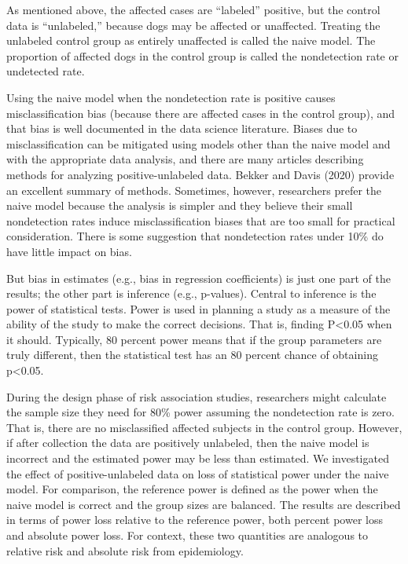 \documentclass[
]{article}
\begin{document}
As mentioned above, the affected cases are ``labeled'' positive, but the
control data is ``unlabeled,'' because dogs may be affected or
unaffected. Treating the unlabeled control group as entirely unaffected
is called the naive model. The proportion of affected dogs in the
control group is called the nondetection rate or undetected rate.

Using the naive model when the nondetection rate is positive causes
misclassification bias (because there are affected cases in the control
group), and that bias is well documented in the data science
literature.\cite{bd20} Biases due to misclassification can be mitigated
using models other than the naive model and with the appropriate data
analysis, and there are many articles describing methods for analyzing
positive-unlabeled data. Bekker and Davis (2020) provide an excellent
summary of methods.\cite{bd20} Sometimes, however, researchers prefer
the naive model because the analysis is simpler and they believe their
small nondetection rates induce misclassification biases that are too
small for practical consideration. There is some suggestion that
nondetection rates under 10\% do have little impact on bias.\cite{bd20}

But bias in estimates (e.g., bias in regression coefficients) is just
one part of the results; the other part is inference (e.g., p-values).
Central to inference is the power of statistical tests. Power is used in
planning a study as a measure of the ability of the study to make the
correct decisions. That is, finding P\textless0.05 when it should.
Typically, 80 percent power means that if the group parameters are truly
different, then the statistical test has an 80 percent chance of
obtaining p\textless0.05.

During the design phase of risk association studies, researchers might
calculate the sample size they need for 80\% power assuming the
nondetection rate is zero. That is, there are no misclassified affected
subjects in the control group. However, if after collection the data are
positively unlabeled, then the naive model is incorrect and the
estimated power may be less than estimated. We investigated the effect
of positive-unlabeled data on loss of statistical power under the naive
model. For comparison, the reference power is defined as the power when
the naive model is correct and the group sizes are balanced. The results
are described in terms of power loss relative to the reference power,
both percent power loss and absolute power loss. For context, these two
quantities are analogous to relative risk and absolute risk from
epidemiology.
\end{document}
